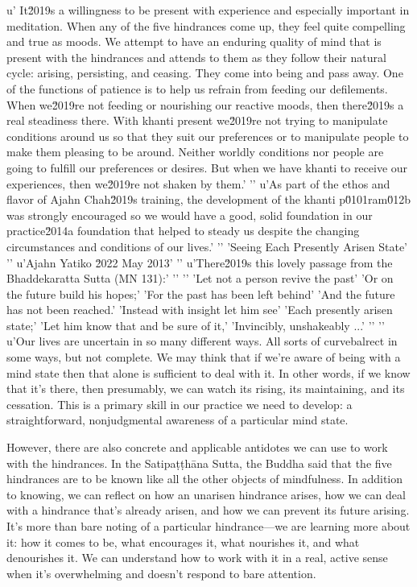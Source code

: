 u' It\u2019s a willingness to be present with experience and especially important in meditation. When any of the five hindrances come up, they feel quite compelling and true as moods. We attempt to have an enduring quality of mind that is present with the hindrances and attends to them as they follow their natural cycle: arising, persisting, and ceasing. They come into being and pass away. One of the functions of patience is to help us refrain from feeding our defilements. When we\u2019re not feeding or nourishing our reactive moods, then there\u2019s a real steadiness there. With khanti present we\u2019re not trying to manipulate conditions around us so that they suit our preferences or to manipulate people to make them pleasing to be around. Neither worldly conditions nor people are going to fulfill our preferences or desires. But when we have khanti to receive our experiences, then we\u2019re not shaken by them.'
'\n'
u'As part of the ethos and flavor of Ajahn Chah\u2019s training, the development of the khanti p\u0101ram\u012b was strongly encouraged so we would have a good, solid foundation in our practice\u2014a foundation that helped to steady us despite the changing circumstances and conditions of our lives.'
'\n'
'Seeing Each Presently Arisen State'
'\n'
u'Ajahn Yatiko \u2022 May 2013'
'\n'
u'There\u2019s this lovely passage from the Bhaddekaratta Sutta (MN 131):'
'\n'
'\n'
'Let not a person revive the past'
'Or on the future build his hopes;'
'For the past has been left behind'
'And the future has not been reached.'
'Instead with insight let him see'
'Each presently arisen state;'
'Let him know that and be sure of it,'
'Invincibly, unshakeably ...'
'\n'
'\n'
u'Our lives are uncertain in so many different ways. All sorts of curvebalrect in some ways, but not complete. We may 
think that if we're aware of being with a mind state then that alone is 
sufficient to deal with it. In other words, if we know that it's there, 
then presumably, we can watch its rising, its maintaining, and its 
cessation. This is a primary skill in our practice we need to develop: 
a straightforward, nonjudgmental awareness of a particular mind state.

However, there are also concrete and applicable antidotes we can use to 
work with the hindrances. In the Satipaṭṭhāna Sutta, the Buddha 
said that the five hindrances are to be known like all the other 
objects of mindfulness. In addition to knowing, we can reflect on how 
an unarisen hindrance arises, how we can deal with a hindrance that's 
already arisen, and how we can prevent its future arising. It's more 
than bare noting of a particular hindrance---we are learning more about 
it: how it comes to be, what encourages it, what nourishes it, and what 
denourishes it. We can understand how to work with it in a real, active 
sense when it's overwhelming and doesn't respond to bare attention.

